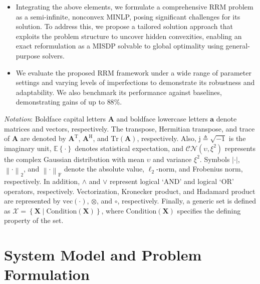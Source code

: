\documentclass[10pt,journal,compsoc]{IEEEtran}
\theoremstyle{myremark}
\theoremstyle{myexample}
\begin{document}
\begin{itemize}
	\item Integrating the above elements, we formulate a comprehensive \gls{RRM} problem as a semi-infinite, nonconvex \gls{MINLP}, posing significant challenges for its solution. To address this, we propose a tailored solution approach that exploits the problem structure to uncover hidden convexities, enabling an exact reformulation as a \gls{MISDP} solvable to global optimality using general-purpose solvers.
	
	\item We evaluate the proposed \gls{RRM} framework under a wide range of parameter settings and varying levels of imperfections to demonstrate its robustness and adaptability. We also benchmark its performance against baselines, demonstrating gains of up to $ 88\% $.
	
\end{itemize}






\emph{Notation}: Boldface capital letters $ \mathbf{A} $ and boldface lowercase letters $ \mathbf{a} $ denote matrices and vectors, respectively. The transpose, Hermitian transpose, and trace of $ \mathbf{A} $ are denoted by $ \mathbf{A}^\mathrm{T} $, $ \mathbf{A}^\mathrm{H} $, and $ \mathrm{Tr} \left(  \mathbf{A} \right) $, respectively. Also, $ \mathrm{j} \triangleq \sqrt{-1} $ is the imaginary unit, $ \mathbb{E} \left\lbrace \cdot \right\rbrace  $ denotes statistical expectation, and $ \mathcal{CN} \left( \upsilon, \xi^2 \right) $ represents the complex Gaussian distribution with mean $ \upsilon $ and variance $ \xi^2 $. Symbols $ \left| \cdot \right| $, $ \left\| \cdot \right\|_2 $, and  $ \left\| \cdot \right\|_\mathrm{F} $ denote the absolute value, $ \ell_2 $-norm, and Frobenius norm, respectively. In addition, $ \wedge $ and $ \lor $ represent logical `AND' and logical `OR' operators, respectively. Vectorization, Kronecker product, and Hadamard product are represented by $ \mathrm{vec} \left( \cdot \right) $, $ \otimes $, and $ \circ $, respectively. Finally, a generic set is defined as $ \mathcal{X} = \left\lbrace \mathbf{X} \mid \mathrm{Condition}  (\mathbf{X}) \right\rbrace $, where $ \mathrm{Condition}  (\mathbf{X}) $ specifies the defining property of the set.




\section{System Model and Problem Formulation} \label{sec:system-model-problem-formulation}
\end{document}
